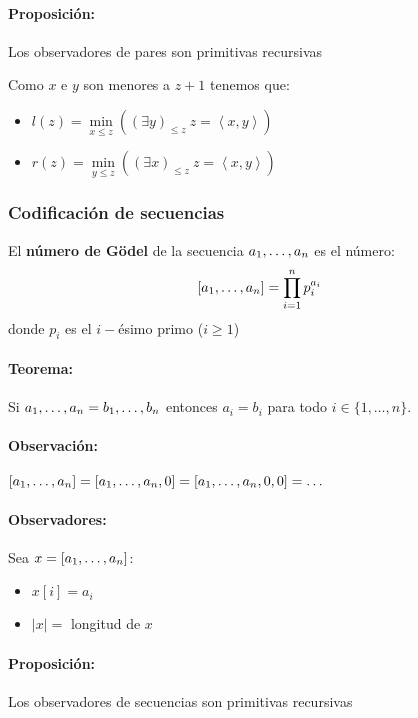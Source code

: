 \paragraph{Proposición:} Los observadores de pares son primitivas recursivas
\begin{demo}
	Como $x$ e $y$ son menores a $z +1$ tenemos que:
	\begin{itemize}
		\item $l(z) = \min\limits_{x\leq z} \left(\left(\exists y\right)_{\leq z}~ z = \left\langle x,y\right\rangle\right)$
		\item $r(z) = \min\limits_{y\leq z} \left(\left(\exists x\right)_{\leq z}~ z = \left\langle x,y\right\rangle\right)$
	\end{itemize}
\end{demo}

\subsubsection{Codificación de secuencias}
El \textbf{número de Gödel} de la secuencia $a_1,\dots, a_{n}$ es el número:
$$[a_1,\dots, a_{n}] = \prod_{i=1}^{n} p_i^{a_i}$$
donde $p_i$ es el $i-$ésimo primo ($i\geq 1$)

\paragraph{Teorema:} Si $a_1,\dots, a_{n} = b_1,\dots, b_{n}$ entonces $a_i = b_i$ para todo $i\in\{1,\dots,n\}$.

\paragraph{Observación:} $[a_1,\dots, a_{n}] = [a_1,\dots, a_{n},0] = [a_1,\dots, a_{n},0,0]= \dots$

\paragraph{Observadores:} Sea $x=[a_1,\dots, a_{n}]$:
\begin{itemize}
	\item $x[i] = a_i$
	\item $|x| =$ longitud de $x$
\end{itemize}

\paragraph{Proposición:} Los observadores de secuencias son primitivas recursivas


